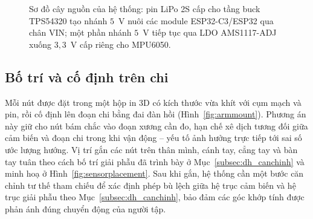 \documentclass[../DoAn.tex]{subfiles}
\begin{document}
\begin{figure}[h]
    \centering
    \caption{Sơ đồ cây nguồn của hệ thống: pin LiPo 2S cấp cho tầng buck TPS54320 tạo nhánh $5$~V nuôi các module ESP32-C3/ESP32 qua chân VIN; một phần nhánh $5$~V tiếp tục qua LDO AMS1117-ADJ xuống $3{,}3$~V cấp riêng cho MPU6050.}
    \label{fig:powertree}
\end{figure}

\subsection{Bố trí và cố định trên chi}
\label{subsec:hw_deo}
Mỗi nút được đặt trong một hộp in 3D có kích thước vừa khít với cụm mạch và pin,
rồi cố định lên đoạn chi bằng đai đàn hồi (Hình~\ref{fig:armmount}). Phương án này giữ cho nút bám chắc vào
đoạn xương cần đo, hạn chế xê dịch tương đối giữa cảm biến và đoạn chi trong khi
vận động -- yếu tố ảnh hưởng trực tiếp tới sai số ước lượng hướng. Vị trí gắn các
nút trên thân mình, cánh tay, cẳng tay và bàn tay tuân theo cách bố trí giải phẫu
đã trình bày ở Mục~\ref{subsec:dh_canchinh} và minh hoạ ở
Hình~\ref{fig:sensorplacement}. Sau khi gắn, hệ thống cần một bước căn chỉnh tư
thế tham chiếu để xác định phép bù lệch giữa hệ trục cảm biến và hệ trục giải phẫu
theo Mục~\ref{subsec:dh_canchinh}, bảo đảm các góc khớp tính được phản ánh đúng
chuyển động của người tập.
\end{document}
